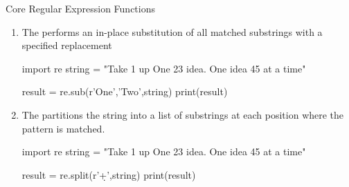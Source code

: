 \documentclass[10pt]{article}
\begin{document}
\begin{core}{Core Regular Expression Functions}
\begin{enumerate}
      \begin{pyconsole}

        import re
        string = "Take 1 up One 23 idea. One idea 45 at a time"

        result = re.match('T\w\w',string)
        print(result.group())

      \end{pyconsole}

      \item The  performs an in-place substitution of all matched substrings with a specified replacement

      \begin{pyconsole}

        import re
        string = "Take 1 up One 23 idea. One idea 45 at a time"

        result = re.sub(r'One','Two',string)
        print(result)

      \end{pyconsole}

      \item The  partitions the string into a list of substrings at each position where the pattern is matched.

      \begin{pyconsole}

        import re
        string = "Take 1 up One 23 idea. One idea 45 at a time"

        result = re.split(r'\d+',string)
        print(result)

      \end{pyconsole}

    \end{enumerate}

  \end{core}
\end{document}
